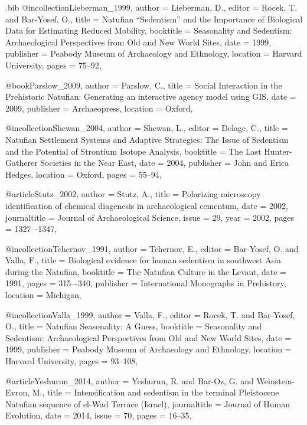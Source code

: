 \begin{filecontents}{\IJSRAidentifier.bib}
@incollection{Lieberman_1999,
	author = {Lieberman, D.},
	editor = {Rocek, T. and Bar-Yosef, O.},
	title = {Natufian “Sedentism” and the Importance of Biological Data for 	Estimating Reduced Mobility},
	booktitle = {Seasonality and Sedentism: Archaeological Perspectives from Old and New World Sites},
	date = {1999},
	publisher = {Peabody Museum of Archaeology and Ethnology},
	location = {Harvard University},
	pages = {75--92},
}

@book{Parslow_2009,
	author = {Parslow, C.},
	title = {Social Interaction in the Prehistoric Natufian: Generating an interactive agency model using GIS},
	date = {2009},
	publisher = {Archaeopress},
	location = {Oxford},	
}

@incollection{Shewan_2004,
	author = {Shewan, L.},
	editor = {Delage, C.},
	title = {Natufian Settlement Systems and Adaptive Strategies: The Issue of Sedentism and the Potential of Strontium Isotope Analysis},
	booktitle = {The Last Hunter-Gatherer Societies in the Near East},
	date = {2004},
	publisher = {John and Erica Hedges},
	location = {Oxford},
	pages = {55--94},
}

@article{Stutz_2002,
	author = {Stutz, A.},
	title = {Polarizing microscopy identification of chemical diagenesis in 	archaeological cementum},
	date = {2002},
	journaltitle = {Journal of Archaeological Science},
	issue = {29},
	year = {2002},
	pages = {1327–-1347},
}

@incollection{Tchernov_1991,
	author = {Tchernov, E.},
	editor = {Bar-Yosef, O. and Valla, F.},
	title = {Biological evidence for human sedentism in southwest Asia during 	the Natufian},
	booktitle = {The Natufian Culture in the Levant},
	date = {1991},
	pages = {315–-340},
	publisher = {International 	Monographs in Prehistory},
	location = {Michigan},
}

@incollection{Valla_1999,
	author = {Valla, F.},
	editor = {Rocek, T. and Bar-Yosef, O.},
	title = {Natufian Seasonality: A Guess},
	booktitle = {Seasonality and Sedentism: Archaeological Perspectives from Old and New World Sites},
	date = {1999},
	publisher = {Peabody Museum of Archaeology and Ethnology},
	location = {Harvard University},
	pages = {93--108},
}

@article{Yeshurun_2014,
	author = {Yeshurun, R. and Bar-Oz, G. and Weinstein-Evron, M.},
	title = {Intensification and sedentism in 	the terminal Pleistocene Natufian sequence of el-Wad Terrace (Israel)},
	journaltitle = {Journal of 	Human Evolution},
	date = {2014},
	issue = {70},
	pages = {16--35},
}


\end{filecontents}
%
\IJSRAopening%


